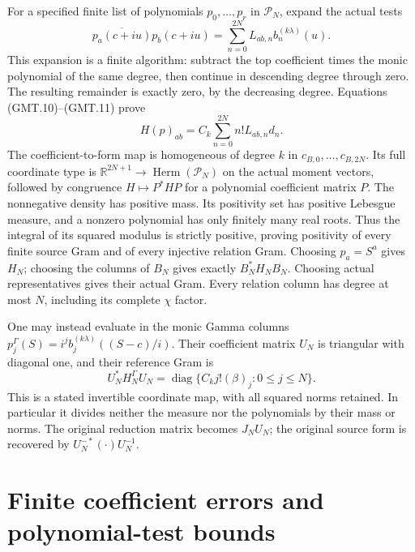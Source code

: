 \documentclass[11pt]{article}
\newcommand{\R}{\mathbb R}
\newcommand{\diag}{\operatorname{diag}}
\begin{document}
For a specified finite list of polynomials $p_0,\ldots,p_r$ in
$\mathcal P_N$, expand the actual tests
\[
 \overline{p_a(c+iu)}p_b(c+iu)
       =\sum_{n=0}^{2N}L_{ab,n}b_n^{(k\lambda)}(u).
\]
This expansion is a finite algorithm: subtract the top coefficient
times the monic polynomial of the same degree, then continue in
descending degree through zero. The resulting remainder is exactly
zero, by the decreasing degree. Equations (GMT.10)--(GMT.11) prove
\[
 \boxed{H(p)_{ab}=C_k\sum_{n=0}^{2N}n!L_{ab,n}d_n.}            \tag{GMT.12}
\]
The coefficient-to-form map is homogeneous of degree $k$ in
$c_{B,0},\ldots,c_{B,2N}$. Its full coordinate type is
$\R^{2N+1}\to\operatorname{Herm}(\mathcal P_N)$ on the actual
moment vectors, followed by congruence $H\mapsto P^*HP$ for a
polynomial coefficient matrix $P$. The nonnegative density has positive
mass. Its positivity set has positive Lebesgue measure, and a nonzero
polynomial has only finitely many real roots. Thus the integral of its
squared modulus is strictly positive, proving positivity of every finite
source Gram and of every injective relation Gram. Choosing $p_a=S^a$ gives
$H_N$; choosing the columns of $B_N$ gives exactly $B_N^*H_NB_N$.
Choosing actual representatives gives their actual Gram. Every relation
column has degree at most $N$, including its complete $\chi$ factor.

One may instead evaluate in the monic Gamma columns
$p_j^\Gamma(S)=i^j b_j^{(k\lambda)}((S-c)/i)$.
Their coefficient matrix $U_N$ is triangular with diagonal one,
and their reference Gram is
\[
 U_N^*H_N^\Gamma U_N
       =\diag\{C_kj!(\beta)_j:0\le j\le N\}.                  \tag{GMT.13}
\]
This is a stated invertible coordinate map, with all squared norms
retained. In particular it divides neither the measure nor the polynomials
by their mass or norms. The original reduction matrix becomes $J_NU_N$;
the original source form is recovered by $U_N^{-*}(\cdot)U_N^{-1}$.

\section{Finite coefficient errors and polynomial-test bounds}
\end{document}
